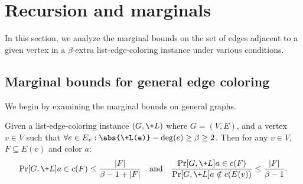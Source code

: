 \documentclass[a4paper,11pt]{article}
\begin{document}
 \section{Recursion and marginals}\label{sec:marginals}
In this section, we analyze the marginal bounds on the set of edges adjacent to a given vertex in a $\beta$-extra list-edge-coloring instance under various conditions.
\subsection{Marginal bounds for general edge coloring}
We begin by examining the marginal bounds on general graphs.
\begin{lemma}\label{lem:claw-marginal-generalized}
     Given a list-edge-coloring instance $(G, \+L)$ where $G=(V, E)$,
     and a vertex $v\in V$ such that $\forall e\in E_{v}: \abs{\+L(e)}-\deg(e) \ge \beta\ge 2$.
    Then for any $v\in V$, $F\subseteq E(v)$ and color $a$:
    \[\Pr[G,\+L]{a\in c(F)} \le \frac{|F|}{\beta - 1 + |F|}\quad\mbox{and}\quad \frac{\Pr[G,\+L]{a\in c(F)}}{\Pr[G,\+L]{a \notin c(E(v))}} \le \frac{|F|}{\beta - 1}.\]
\end{lemma}
\end{document}
